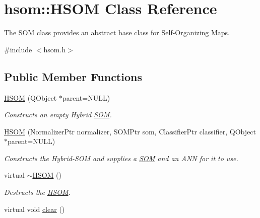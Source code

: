 \hypertarget{classhsom_1_1_h_s_o_m}{\section{hsom\-:\-:\-H\-S\-O\-M \-Class \-Reference}
\label{classhsom_1_1_h_s_o_m}
}


\-The \hyperlink{classhsom_1_1_s_o_m}{\-S\-O\-M} class provides an abstract base class for \-Self-\/\-Organizing \-Maps.  




{\ttfamily \#include $<$hsom.\-h$>$}

\subsection*{\-Public \-Member \-Functions}
\begin{DoxyCompactItemize}
\item 
\hyperlink{classhsom_1_1_h_s_o_m_af03125b52782ed511021562aa9e44acf}{\-H\-S\-O\-M} (\-Q\-Object $\ast$parent=\-N\-U\-L\-L)
\begin{DoxyCompactList}\small\item\em \-Constructs an empty \-Hybrid \hyperlink{classhsom_1_1_s_o_m}{\-S\-O\-M}. \end{DoxyCompactList}\item 
\hyperlink{classhsom_1_1_h_s_o_m_a96b649d5e6d6531a07e699c2ea807abb}{\-H\-S\-O\-M} (\-Normalizer\-Ptr normalizer, \-S\-O\-M\-Ptr som, \-Classifier\-Ptr classifier, \-Q\-Object $\ast$parent=\-N\-U\-L\-L)
\begin{DoxyCompactList}\small\item\em \-Constructs the \-Hybrid-\/\-S\-O\-M and supplies a \hyperlink{classhsom_1_1_s_o_m}{\-S\-O\-M} and an \-A\-N\-N for it to use. \end{DoxyCompactList}\item 
\hypertarget{classhsom_1_1_h_s_o_m_a58038ba3d4bd255ec0dd15604d9a2a3e}{virtual \hyperlink{classhsom_1_1_h_s_o_m_a58038ba3d4bd255ec0dd15604d9a2a3e}{$\sim$\-H\-S\-O\-M} ()}\label{classhsom_1_1_h_s_o_m_a58038ba3d4bd255ec0dd15604d9a2a3e}

\begin{DoxyCompactList}\small\item\em \-Destructs the \hyperlink{classhsom_1_1_h_s_o_m}{\-H\-S\-O\-M}. \end{DoxyCompactList}\item 
\hypertarget{classhsom_1_1_h_s_o_m_a4a7d4cd2e51394425dcce16667832130}{virtual void \hyperlink{classhsom_1_1_h_s_o_m_a4a7d4cd2e51394425dcce16667832130}{clear} ()}\label{classhsom_1_1_h_s_o_m_a4a7d4cd2e51394425dcce16667832130}


\end{DoxyCompactItemize}
